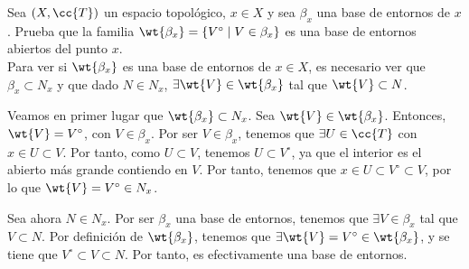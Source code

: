 \begin{ejercicio}
    Sea $(X,\cc{T})$ un espacio topológico, $x\in X$ y sea $\beta_x$ una base de entornos de $x$. Prueba que la familia $\wt{\beta_x}=\{V^\circ\mid V\in \beta_x\}$ es una base de entornos abiertos del punto $x$.\\

    Para ver si $\wt{\beta_x}$ es una base de entornos de $x\in X$, es necesario ver que $\beta_x\subset N_x$ y que dado $N\in N_x$, $\exists \wt{V}\in \wt{\beta_x}$ tal que $\wt{V}\subset N$.

    Veamos en primer lugar que $\wt{\beta_x}\subset N_x$. Sea $\wt{V}\in \wt{\beta_x}$. Entonces, $\wt{V}=V^\circ$, con $V\in \beta_x$. Por ser $V\in \beta_x$, tenemos que $\exists U\in \cc{T}$ con $x\in U\subset V$. Por tanto, como $U\subset V$, tenemos $U\subset V^\circ$, ya que el interior es el abierto más grande contiendo en $V$. Por tanto, tenemos que $x\in U\subset V^\circ \subset V$, por lo que $\wt{V}=V^\circ \in N_x$.

    Sea ahora $N\in N_x$. Por ser $\beta_x$ una base de entornos, tenemos que $\exists V\in \beta_x$ tal que $V\subset N$. Por definición de $\wt{\beta_x}$, tenemos que $\exists \wt{V}=V^\circ \in \wt{\beta_x}$, y se tiene que $V^\circ\subset V\subset N$. Por tanto, es efectivamente una base de entornos.
\end{ejercicio}

